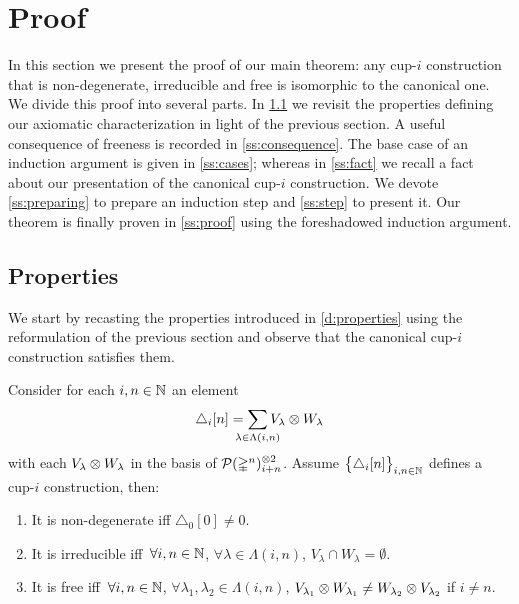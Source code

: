 
\section{Proof} \label{s:proof}

In this section we present the proof of our main theorem: any \mbox{cup-$i$} construction that is non-degenerate, irreducible and free is isomorphic to the canonical one.
We divide this proof into several parts.
In \cref{ss:properties} we revisit the properties defining our axiomatic characterization in light of the previous section.
A useful consequence of freeness is recorded in \cref{ss:consequence}.
The base case of an induction argument is given in \cref{ss:cases}; whereas in
\cref{ss:fact} we recall a fact about our presentation of the canonical cup-$i$ construction.
We devote \cref{ss:preparing} to prepare an induction step and \cref{ss:step} to present it.
Our theorem is finally proven in \cref{ss:proof} using the foreshadowed induction argument.

\subsection{Properties} \label{ss:properties}

We start by recasting the properties introduced in \cref{d:properties} using the reformulation of the previous section and observe that the canonical cup-$i$ construction satisfies them.

\begin{lemma} \label{l:properties}
	Consider for each $i,n \in \mathbb{N}$ an element
	\[
	\triangle_i [n] =
	\sum_{\mathclap{\lambda \in \Lambda(i,n)}} V_\lambda \ot W_\lambda
	\]
	with each $V_\lambda \otimes W_\lambda$ in the basis of $\mathcal{P}(\mathbb{\Delta}^n)^{\otimes 2}_{i+n}$.
	Assume $\big\{ \triangle_i [n] \big\}_{i,n \in \mathbb{N}}$ defines a \mbox{cup-$i$} construction, then:
	\begin{enumerate}
		\item It is non-degenerate iff
		$\triangle_0 [0] \neq 0$.
		\item It is irreducible iff\,
		$\forall i,n \in \mathbb{N}$, $\forall \lambda \in \Lambda(i,n)$, $V_\lambda \cap W_\lambda = \emptyset$.
		\item \label{i:free} It is free iff\,
		$\forall i,n \in \mathbb{N}$, $\forall \lambda_1, \lambda_2 \in \Lambda(i,n)$, $V_{\lambda_1} \otimes W_{\lambda_1} \neq W_{\lambda_2} \otimes V_{\lambda_2}$ if $i \neq n$.
	\end{enumerate}
\end{lemma}

